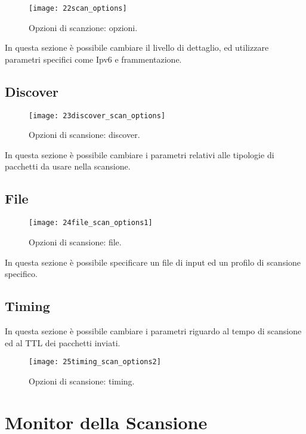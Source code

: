 \begin{figure}[h]
  \centering
  \texttt{[image: 22scan\_options]}
  \caption{Opzioni di scanzione: opzioni.}
  \label{fig:ContentsScanOptionsScanParamOptions}
\end{figure}
In questa sezione \`e possibile cambiare il livello di dettaglio, ed utilizzare 
parametri specifici come Ipv6 e frammentazione.

\subsection{Discover}
\label{sec:ContentsScanOptionsScanDiscover}

\begin{figure}[h]
  \centering
  \texttt{[image: 23discover\_scan\_options]}
  \caption{Opzioni di scansione: discover.}
  \label{fig:ContentsScanOptionsScanDiscover}
\end{figure}
In questa sezione \`e possibile cambiare i parametri relativi alle tipologie di 
pacchetti da usare nella scansione.

\subsection{File}
\label{sec:ContentsScanOptionsScanFile}

\begin{figure}[h]
  \centering
  \texttt{[image: 24file\_scan\_options1]}
  \caption{Opzioni di scansione: file.}
  \label{fig:ContentsScanOptionsScanFile}
\end{figure}
In questa sezione \`e possibile specificare un file di input ed un profilo 
di scansione specifico.

\subsection{Timing}
\label{sec:ContentsScanOptionsScanTiming}

In questa sezione \`e possibile cambiare i parametri riguardo al tempo di 
scansione ed al TTL dei pacchetti inviati.
\begin{figure}[h]
  \centering
  \texttt{[image: 25timing\_scan\_options2]}
  \caption{Opzioni di scansione: timing.}
  \label{fig:ConentsScanOptionsScanTiming}
\end{figure}


\section{Monitor della Scansione}
\label{sec:ContentsScanMonitor}

